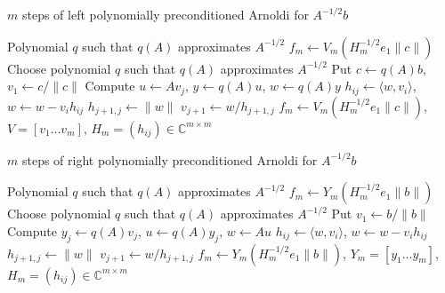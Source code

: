 \begin{algorithm}[H]
    \caption{$m$ steps of left polynomially preconditioned Arnoldi for $A^{-1/2}b$ \cite{49}}
    \label{alg:left_polynomially_preconditioned_Arnoldi}
    \begin{algorithmic}[1]
        \REQUIRE Polynomial $q$ such that $q(A)$ approximates $A^{-1/2}$
        \ENSURE $f_m \gets V_m(H_m^{-1/2} e_1 \|c\|)$
        \STATE Choose polynomial $q$ such that $q(A)$ approximates $A^{-1/2}$
        \STATE Put $c \gets q(A)b$, $v_1 \gets c / \|c\|$
            \STATE {}
            \STATE Compute $u \gets Av_j$, $y \gets q(A)u$, $w \gets q(A)y$
                \STATE $h_{ij} \gets \langle w, v_i \rangle$, $w \gets w - v_i h_{ij}$ 
            \ENDFOR
            \STATE $h_{j+1,j} \gets \|w\|$
            \STATE $v_{j+1} \gets w / h_{j+1,j}$
        \ENDFOR
        \STATE $f_m \gets V_m(H_m^{-1/2} e_1 \|c\|)$, $V = [v_1 \dots v_m]$, $H_m = (h_{ij}) \in \mathbb{C}^{m \times m}$ 
    \end{algorithmic}
\end{algorithm}


\begin{algorithm}[H]
    \caption{$m$ steps of right polynomially preconditioned Arnoldi for $A^{-1/2}b$ \cite{49}}
    \label{alg:right_polynomially_preconditioned_Arnoldi}
    \begin{algorithmic}[1]
        \REQUIRE Polynomial $q$ such that $q(A)$ approximates $A^{-1/2}$
        \ENSURE $f_m \gets Y_m(H_m^{-1/2} e_1 \|b\|)$
        \STATE Choose polynomial $q$ such that $q(A)$ approximates $A^{-1/2}$
        \STATE Put $v_1 \gets b / \|b\|$
            \STATE {}
            \STATE Compute $y_j \gets q(A)v_j$, $u \gets q(A)y_j$, $w \gets Au$
                \STATE $h_{ij} \gets \langle w, v_i \rangle$, $w \gets w - v_i h_{ij}$ 
            \ENDFOR
            \STATE $h_{j+1,j} \gets \|w\|$
            \STATE $v_{j+1} \gets w / h_{j+1,j}$
        \ENDFOR
        \STATE $f_m \gets Y_m(H_m^{-1/2} e_1 \|b\|)$, $Y_m = [y_1 \dots y_m]$, $H_m = (h_{ij}) \in \mathbb{C}^{m \times m}$ 
    \end{algorithmic}
\end{algorithm}


